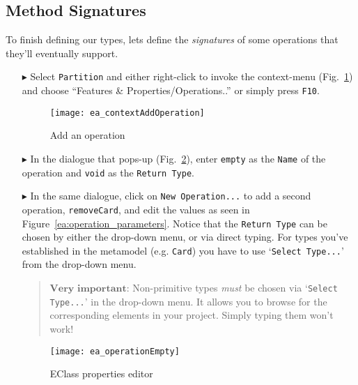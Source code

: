 \newpage
\subsection{Method Signatures}
\visHeader
\hypertarget{static:methods vis}{}

To finish defining our types, lets define the \emph{signatures} of some operations that they'll eventually support.

\begin{enumerate}

\item[$\blacktriangleright$] Select \texttt{Partition} and either right-click to invoke the context-menu (Fig.~\ref{ea:add_operation})  and choose ``Features \&
Properties/Operations..'' or simply press \texttt{F10}.

\begin{figure}[htbp]
	\centering
  \texttt{[image: ea\_contextAddOperation]}
	\caption{Add an operation}
	\label{ea:add_operation}
\end{figure}
\FloatBarrier

\item[$\blacktriangleright$] In the dialogue that pops-up (Fig.~\ref{ea:operation_properties}), enter \texttt{empty} as the \texttt{Name} of the operation and \texttt{void} as the \texttt{Return Type}.

\vspace{0.5cm}

\item[$\blacktriangleright$] In the same dialogue, click on \texttt{New Operation...} to add a second operation, \texttt{removeCard}, and edit the values as seen in 
Figure~\ref{ea:operation_parameters}. Notice that the \texttt{Return Type} can be chosen by either the drop-down menu, or via direct typing. For types you've established in
the metamodel (e.g. \texttt{Card}) you have to use `\texttt{Select Type...}' from the drop-down menu.
\vspace{-.3cm}
\begin{quote}
{ \small
$\textbf{Very important:}$ Non-primitive types \emph{must} be chosen via `\texttt{Select Type...}' in the drop-down menu. It allows you to browse for the corresponding elements in
your project. Simply typing them won't work!
}
\end{quote}

\begin{figure}[htbp]
	\centering
  	\texttt{[image: ea\_operationEmpty]}
	\caption{EClass properties editor}
	\label{ea:operation_properties}
\end{figure}



\end{enumerate}
